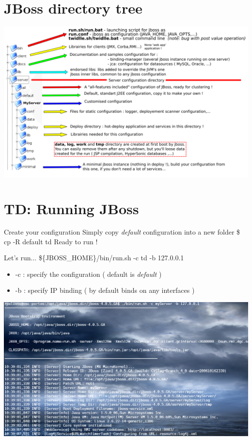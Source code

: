 \documentclass[handout]{beamer}
\begin{document}
\section{JBoss directory tree}
	\begin{frame}
		\includegraphics[scale=0.4]{../img/jbossdirectorytree.png}			 
	\end{frame}
\section{TD: Running JBoss}
	\begin{frame}
		\begin{block}{Create your configuration}
			Simply copy \textit{default} configuration into a new folder
		 	\$ cp -R default td
			Ready to run !
		\end{block}
		\begin{block}{Let's run...}
			\$\{JBOSS\_HOME\}/bin/run.sh -c td -b 127.0.0.1
			\begin{itemize}
				\item	-c : specify the configuration ( default is \textit{default} )
				\item	-b : specify IP binding ( by default binds on any interfaces )
			\end{itemize}
		\end{block}
		\begin{center}
			\includegraphics[scale=0.15]{../img/jboss-start.png}
		\end{center}
	\end{frame}
\end{document}
